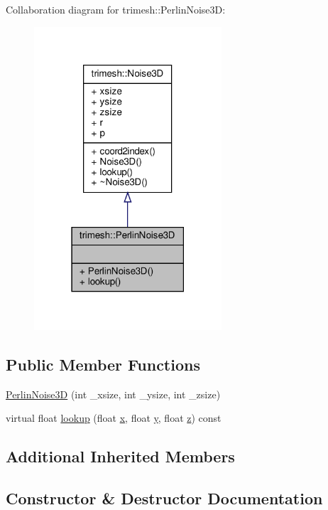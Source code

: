 Collaboration diagram for trimesh\+:\+:Perlin\+Noise3D\+:\nopagebreak
\begin{figure}[H]
\begin{center}
\leavevmode
\includegraphics[width=198pt]{d2/d24/classtrimesh_1_1PerlinNoise3D__coll__graph}
\end{center}
\end{figure}
\subsection*{Public Member Functions}
\begin{DoxyCompactItemize}
\item 
\hyperlink{classtrimesh_1_1PerlinNoise3D_a6c5ca102c8e46701a4060e5dca1bac41}{Perlin\+Noise3D} (int \+\_\+xsize, int \+\_\+ysize, int \+\_\+zsize)
\item 
virtual float \hyperlink{classtrimesh_1_1PerlinNoise3D_a441ca024ab5b4da722c9d7edfbb98f33}{lookup} (float \hyperlink{namespacetrimesh_a3365d1b1a1bc5d8e9c844cf589a8c4a8}{x}, float \hyperlink{namespacetrimesh_a56b35d0eb7039be92fcc4867080c7419}{y}, float \hyperlink{namespacetrimesh_a42d0d86cc8db1d2be48121fe5e52fc67}{z}) const
\end{DoxyCompactItemize}
\subsection*{Additional Inherited Members}


\subsection{Constructor \& Destructor Documentation}
\mbox{\label{classtrimesh_1_1PerlinNoise3D_a6c5ca102c8e46701a4060e5dca1bac41}} 
